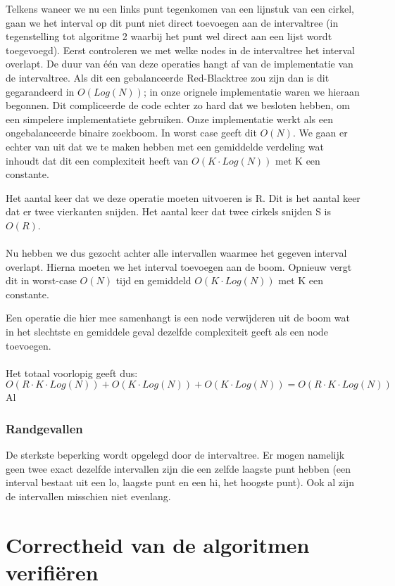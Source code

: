\documentclass[11pt,a4paper]{article}
\begin{document}
Telkens waneer we nu een links punt tegenkomen van een lijnstuk van een cirkel, gaan we het interval op dit punt niet direct toevoegen aan de intervaltree (in tegenstelling tot algoritme 2 waarbij het punt wel direct aan een lijst wordt toegevoegd). Eerst controleren we met welke nodes in de intervaltree het interval overlapt. De duur van \'e\'en van deze operaties hangt af van de implementatie van de intervaltree. Als dit een gebalanceerde Red-Blacktree zou zijn dan is dit gegarandeerd in $O(Log(N))$; in onze orignele implementatie waren we hieraan begonnen. Dit compliceerde de code echter zo hard dat we besloten hebben, om een simpelere implementatiete gebruiken. Onze implementatie werkt als een ongebalanceerde binaire zoekboom. In worst case geeft dit $O(N)$. We gaan er echter van uit dat we te maken hebben met een gemiddelde verdeling wat inhoudt dat dit een complexiteit heeft van $O(K\cdot Log(N))$ met K een constante.


Het aantal keer dat we deze operatie moeten uitvoeren is R. Dit is het aantal keer dat er twee vierkanten snijden. Het aantal keer dat twee cirkels snijden S is $O(R)$. 
\\
\\
Nu hebben we dus gezocht achter alle intervallen waarmee het gegeven interval overlapt. Hierna moeten we het interval toevoegen aan de boom. Opnieuw vergt dit in worst-case $O(N)$ tijd en gemiddeld $O(K\cdot Log(N))$ met K een constante.


Een operatie die hier mee samenhangt is een node verwijderen uit de boom wat in het slechtste en gemiddele geval dezelfde complexiteit geeft als een node toevoegen.
\\
\\
Het totaal voorlopig geeft dus:
$$O(R\cdot K \cdot Log(N)) + O(K\cdot Log(N)) + O(K\cdot Log(N)) = O(R\cdot K \cdot Log(N))$$ 
Al
\subsubsection{Randgevallen}
De sterkste beperking wordt opgelegd door de intervaltree. Er mogen namelijk geen twee exact dezelfde intervallen zijn die een zelfde laagste punt hebben (een interval bestaat uit een lo, laagste punt en een hi, het hoogste punt). Ook al zijn de intervallen misschien niet evenlang. 
\section{Correctheid van de algoritmen verifi\"eren}
\end{document}
